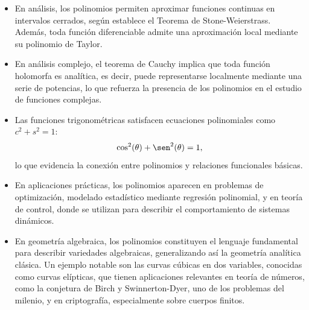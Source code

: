 \begin{itemize}
	\item En análisis, los polinomios permiten aproximar funciones continuas en intervalos cerrados, según establece el Teorema de Stone-Weierstrass. Además, toda función diferenciable admite una aproximación local mediante su polinomio de Taylor.
	
	\item En análisis complejo, el teorema de Cauchy implica que toda función holomorfa es analítica, es decir, puede representarse localmente mediante una serie de potencias, lo que refuerza la presencia de los polinomios en el estudio de funciones complejas.
	
	
		\item Las funciones trigonométricas satisfacen ecuaciones polinomiales como $c^2+s^2=1$:
	\[
	\cos^2(\theta) + \sen^2(\theta) = 1,
	\]
	lo que evidencia la conexión entre polinomios y relaciones funcionales básicas.
	
	
	
	\item En aplicaciones prácticas, los polinomios aparecen en problemas de optimización, modelado estadístico mediante regresión polinomial, y en teoría de control, donde se utilizan para describir el comportamiento de sistemas dinámicos.
	
	
	\item En geometría algebraica, los polinomios constituyen el lenguaje fundamental para describir variedades algebraicas, generalizando así la geometría analítica clásica. Un ejemplo notable son las curvas cúbicas en dos variables, conocidas como curvas elípticas, que tienen aplicaciones relevantes en teoría de números, como la conjetura de Birch y Swinnerton-Dyer, uno de los problemas del milenio, y en criptografía, especialmente sobre cuerpos finitos.


\end{itemize}
